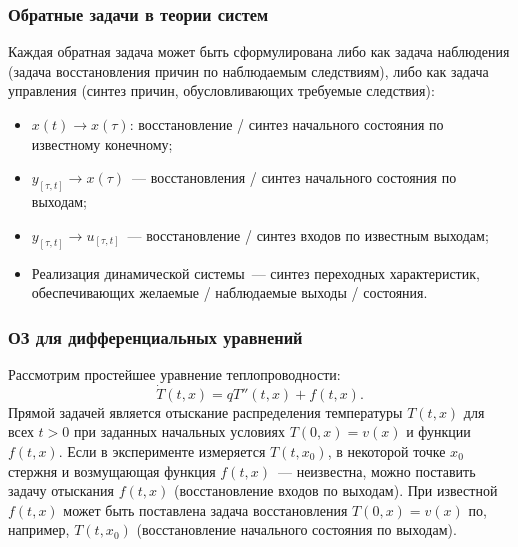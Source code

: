 \documentclass[compress]{beamer}
\begin{document}
    \begin{frame}\frametitle{Обратные задачи в теории систем}

        Каждая обратная задача может быть сформулирована либо как задача наблюдения (задача восстановления причин по наблюдаемым следствиям), либо как задача управления (синтез причин, обусловливающих требуемые следствия):
        \begin{itemize}
            \item $x(t) \to x(\tau)$: восстановление / синтез начального состояния по известному конечному;
            \item $y_{[\tau,t]} \to x(\tau)$~--- восстановления / синтез начального состояния по выходам;
            \item $y_{[\tau,t]} \to u_{[\tau,t]}$~--- восстановление / синтез входов по известным выходам;
            \item Реализация динамической системы~--- синтез переходных характеристик, обеспечивающих желаемые / наблюдаемые выходы / состояния.
        \end{itemize}

    \end{frame}

    \begin{frame}\frametitle{ОЗ для дифференциальных уравнений}

        Рассмотрим простейшее уравнение теплопроводности:
        \begin{equation*}
            \dot{T}(t,x) = q T''(t,x) + f(t,x) .
        \end{equation*}
        Прямой задачей является отыскание распределения температуры $T(t,x)$ для всех $t>0$ при заданных начальных условиях $T(0,x) = v(x)$ и функции $f(t,x)$.
        Если в эксперименте измеряется $T(t,x_0)$, в некоторой точке $x_0$ стержня и возмущающая функция $f(t,x)$~--- неизвестна, можно поставить задачу отыскания $f(t,x)$ (восстановление входов по выходам). При известной $f(t,x)$ может быть поставлена задача восстановления $T(0,x) = v(x)$ по, например, $T(t,x_0)$ (восстановление начального состояния по выходам).

    \end{frame}
\end{document}
